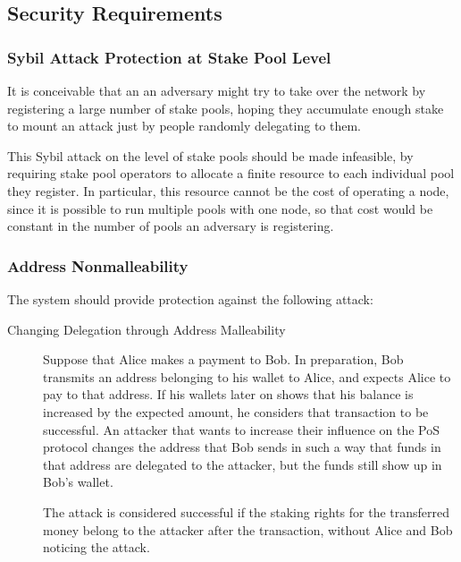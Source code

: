 \documentclass[11pt,a4paper]{article}
\begin{document}
\subsection{Security Requirements}\label{security-requirements}

\subsubsection{Sybil Attack Protection at Stake Pool
Level}\label{sybil-attack-protection-at-stake-pool-level}

It is conceivable that an an adversary might try to take over the
network by registering a large number of stake pools, hoping they
accumulate enough stake to mount an attack just by people randomly
delegating to them.

This Sybil attack on the level of stake pools should be made infeasible,
by requiring stake pool operators to allocate a finite resource to each
individual pool they register. In particular, this resource cannot be
the cost of operating a node, since it is possible to run multiple pools
with one node, so that cost would be constant in the number of pools an
adversary is registering.

\subsubsection{Address Nonmalleability}\label{address-nonmalleability}

The system should provide protection against the following attack:

\begin{description}
\item[Changing Delegation through Address Malleability]
Suppose that Alice makes a payment to Bob. In preparation, Bob transmits
an address belonging to his wallet to Alice, and expects Alice to pay to
that address. If his wallets later on shows that his balance is
increased by the expected amount, he considers that transaction to be
successful. An attacker that wants to increase their influence on the
PoS protocol changes the address that Bob sends in such a way that funds
in that address are delegated to the attacker, but the funds still show
up in Bob's wallet.

The attack is considered successful if the staking rights for the
transferred money belong to the attacker after the transaction, without
Alice and Bob noticing the attack.
\end{description}
\end{document}
